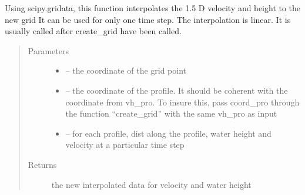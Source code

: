 \documentclass[letterpaper,10pt,english]{sphinxmanual}
\begin{document}
\begin{fulllineitems}
\label{\detokenize{index:src.manage_grid_8.interpo_linear}}
Using scipy.gridata, this function interpolates the 1.5 D velocity and height to the new grid
It can be used for only one time step. The interpolation is linear.
It is usually called after create\_grid have been called.
\begin{quote}\begin{description}
\item[{Parameters}] \leavevmode\begin{itemize}
\item {} 
 -- the coordinate of the grid point

\item {} 
 -- the coordinate of the profile. It should be coherent with the coordinate from vh\_pro.
To insure this, pass coord\_pro through the function ``create\_grid'' with the same vh\_pro as input

\item {} 
 -- for each profile, dist along the profile, water height and velocity at a particular time step

\end{itemize}

\item[{Returns}] \leavevmode
the new interpolated data for velocity and water height

\end{description}\end{quote}

\end{fulllineitems}

\end{document}
